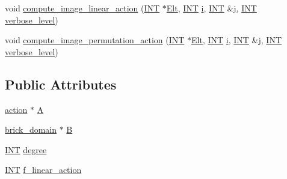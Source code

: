 \begin{DoxyCompactItemize}
\item 
void \mbox{\hyperlink{classaction__on__bricks_a63ff64a1a661a7c2b62076ef9ca43416}{compute\+\_\+image\+\_\+linear\+\_\+action}} (\mbox{\hyperlink{galois_8h_a09fddde158a3a20bd2dcadb609de11dc}{I\+NT}} $\ast$\mbox{\hyperlink{simeon_8_c_aec1406935bdb1fee3561fcb840964100}{Elt}}, \mbox{\hyperlink{galois_8h_a09fddde158a3a20bd2dcadb609de11dc}{I\+NT}} \mbox{\hyperlink{alphabet2_8_c_acb559820d9ca11295b4500f179ef6392}{i}}, \mbox{\hyperlink{galois_8h_a09fddde158a3a20bd2dcadb609de11dc}{I\+NT}} \&\mbox{\hyperlink{alphabet2_8_c_a37d972ae0b47b9099e30983131d31916}{j}}, \mbox{\hyperlink{galois_8h_a09fddde158a3a20bd2dcadb609de11dc}{I\+NT}} \mbox{\hyperlink{simeon_8_c_a818073fbcc2f439e7c56952f67386122}{verbose\+\_\+level}})
\item 
void \mbox{\hyperlink{classaction__on__bricks_a5d60d7aba8eba9f61e76b390f713b1be}{compute\+\_\+image\+\_\+permutation\+\_\+action}} (\mbox{\hyperlink{galois_8h_a09fddde158a3a20bd2dcadb609de11dc}{I\+NT}} $\ast$\mbox{\hyperlink{simeon_8_c_aec1406935bdb1fee3561fcb840964100}{Elt}}, \mbox{\hyperlink{galois_8h_a09fddde158a3a20bd2dcadb609de11dc}{I\+NT}} \mbox{\hyperlink{alphabet2_8_c_acb559820d9ca11295b4500f179ef6392}{i}}, \mbox{\hyperlink{galois_8h_a09fddde158a3a20bd2dcadb609de11dc}{I\+NT}} \&\mbox{\hyperlink{alphabet2_8_c_a37d972ae0b47b9099e30983131d31916}{j}}, \mbox{\hyperlink{galois_8h_a09fddde158a3a20bd2dcadb609de11dc}{I\+NT}} \mbox{\hyperlink{simeon_8_c_a818073fbcc2f439e7c56952f67386122}{verbose\+\_\+level}})
\end{DoxyCompactItemize}
\subsection*{Public Attributes}
\begin{DoxyCompactItemize}
\item 
\mbox{\hyperlink{classaction}{action}} $\ast$ \mbox{\hyperlink{classaction__on__bricks_a8c8eb0a2bd23bf5825449af36f8922c5}{A}}
\item 
\mbox{\hyperlink{classbrick__domain}{brick\+\_\+domain}} $\ast$ \mbox{\hyperlink{classaction__on__bricks_a840d4436d0c88405d583f4545f86620a}{B}}
\item 
\mbox{\hyperlink{galois_8h_a09fddde158a3a20bd2dcadb609de11dc}{I\+NT}} \mbox{\hyperlink{classaction__on__bricks_ad4ce29017b2bf06bef134698246dc47f}{degree}}
\item 
\mbox{\hyperlink{galois_8h_a09fddde158a3a20bd2dcadb609de11dc}{I\+NT}} \mbox{\hyperlink{classaction__on__bricks_a88b884b19c838a2650a40331c949657b}{f\+\_\+linear\+\_\+action}}
\end{DoxyCompactItemize}


